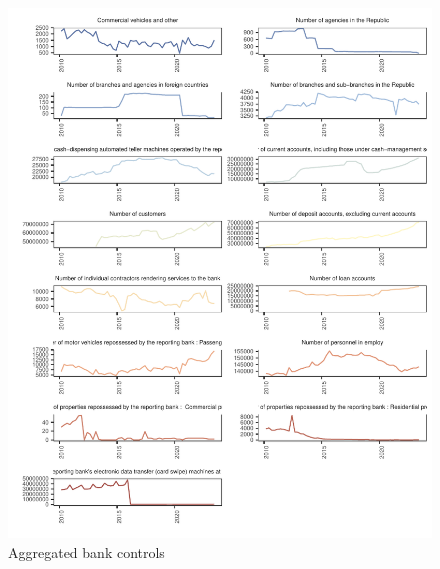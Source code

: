 \documentclass[
  letterpaper,
  DIV=11,
  numbers=noendperiod]{scrartcl}
\begin{document}
\begin{figure}[H]

{\centering \includegraphics{UP_paper_files/figure-pdf/fig-controls-1.pdf}

}

\caption{\label{fig-controls}Aggregated bank controls}

\end{figure}
\end{document}

